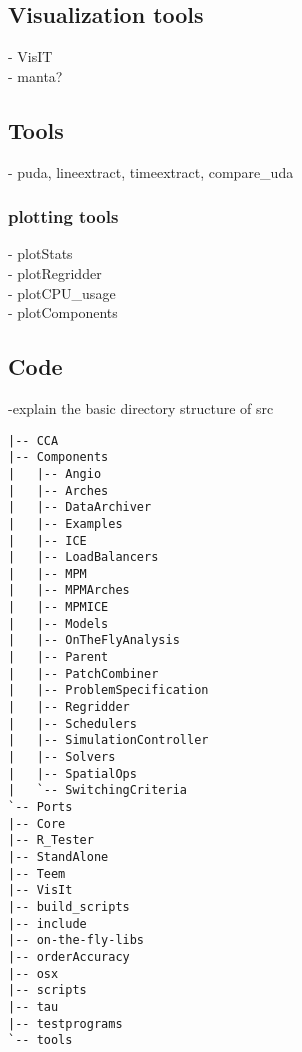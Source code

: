 \subsection{Visualization tools}
- VisIT\\
- manta?

\subsection{Tools}
- puda, lineextract, timeextract, compare\_uda\\

\subsubsection{plotting tools}
- plotStats\\
- plotRegridder \\
- plotCPU\_usage \\
- plotComponents

\subsection{Code}
-explain the basic directory structure of src
\begin{Verbatim}[fontsize=\footnotesize]
|-- CCA
|-- Components
|   |-- Angio
|   |-- Arches
|   |-- DataArchiver
|   |-- Examples
|   |-- ICE
|   |-- LoadBalancers
|   |-- MPM
|   |-- MPMArches
|   |-- MPMICE
|   |-- Models
|   |-- OnTheFlyAnalysis
|   |-- Parent
|   |-- PatchCombiner
|   |-- ProblemSpecification
|   |-- Regridder
|   |-- Schedulers
|   |-- SimulationController
|   |-- Solvers
|   |-- SpatialOps
|   `-- SwitchingCriteria
`-- Ports
|-- Core
|-- R_Tester
|-- StandAlone
|-- Teem
|-- VisIt
|-- build_scripts
|-- include
|-- on-the-fly-libs
|-- orderAccuracy
|-- osx
|-- scripts
|-- tau
|-- testprograms
`-- tools
\end{Verbatim}
